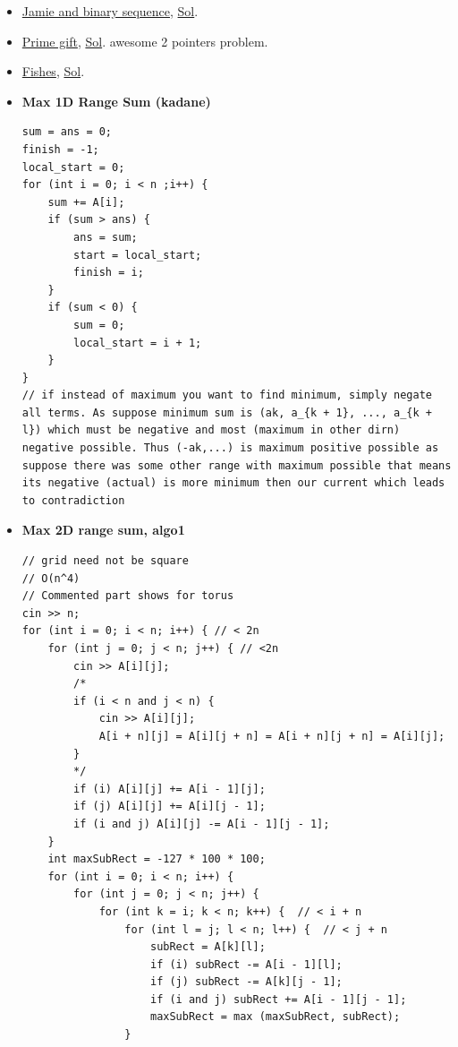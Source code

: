 \documentclass[8pt, a4paper, oneside, twocolumn]{extarticle}
\begin{document}
\begin{itemize}
    \item \href {https://codeforces.com/contest/916/problem/B}{Jamie and binary sequence}, \href {https://github.com/sourabh2311/Competitive-Programming/blob/master/CF/457D2/B.cpp}{Sol}.
    \item \href {https://codeforces.com/contest/912/problem/E}{Prime gift}, \href {https://codeforces.com/contest/912/submission/33976448}{Sol}. awesome 2 pointers problem.
    \item \href {https://codeforces.com/contest/912/problem/D}{Fishes}, \href {https://codeforces.com/blog/entry/56920}{Sol}. 
    \item \textbf{Max 1D Range Sum (kadane)}
    \begin{verbatim}
sum = ans = 0;
finish = -1;
local_start = 0;
for (int i = 0; i < n ;i++) {
    sum += A[i];
    if (sum > ans) {
        ans = sum;
        start = local_start;
        finish = i;
    }
    if (sum < 0) {
        sum = 0;
        local_start = i + 1;
    }
}
// if instead of maximum you want to find minimum, simply negate all terms. As suppose minimum sum is (ak, a_{k + 1}, ..., a_{k + l}) which must be negative and most (maximum in other dirn) negative possible. Thus (-ak,...) is maximum positive possible as suppose there was some other range with maximum possible that means its negative (actual) is more minimum then our current which leads to contradiction
    \end{verbatim}
    \item \textbf{Max 2D range sum, algo1}
    \begin{verbatim}
// grid need not be square
// O(n^4)
// Commented part shows for torus
cin >> n;
for (int i = 0; i < n; i++) { // < 2n
    for (int j = 0; j < n; j++) { // <2n
        cin >> A[i][j]; 
        /*
        if (i < n and j < n) {
            cin >> A[i][j];
            A[i + n][j] = A[i][j + n] = A[i + n][j + n] = A[i][j];
        }
        */
        if (i) A[i][j] += A[i - 1][j];
        if (j) A[i][j] += A[i][j - 1];
        if (i and j) A[i][j] -= A[i - 1][j - 1];
    }
    int maxSubRect = -127 * 100 * 100;
    for (int i = 0; i < n; i++) {
        for (int j = 0; j < n; j++) {
            for (int k = i; k < n; k++) {  // < i + n
                for (int l = j; l < n; l++) {  // < j + n
                    subRect = A[k][l];
                    if (i) subRect -= A[i - 1][l];
                    if (j) subRect -= A[k][j - 1];
                    if (i and j) subRect += A[i - 1][j - 1];
                    maxSubRect = max (maxSubRect, subRect);
                }

\end{verbatim}
\end{itemize}
\end{document}
